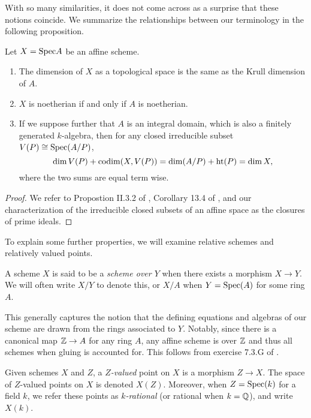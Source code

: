 With so many similarities,
it does not come across as a surprise that these notions coincide.
We summarize the relationships between our terminology in the following proposition.

\begin{proposition}
    Let $X = {\rm Spec} A$ be an affine scheme.
    \begin{enumerate}
        \item The dimension of $X$ as a topological space is the same as the Krull dimension of $A$.
        \item $X$ is noetherian if and only if $A$ is noetherian.
        \item If we suppose further that $A$ is an integral domain, 
        which is also a finitely generated $k$-algebra,
        then for any closed irreducible subset $V(P) \cong {\rm Spec}(A/P)$,
        \[
            \dim V(P) + {\rm codim}(X, V(P)) 
            = \dim(A/P) + {\rm ht}(P) 
            = \dim X,
        \]
        where the two sums are equal term wise.
    \end{enumerate}
\end{proposition}
\begin{proof}
    We refer to Propostion II.3.2 of \cite{Hartshorne_2013},
    Corollary 13.4 of \cite{Eisenbud_2013},
    and our characterization of the irreducible closed subsets of an affine space as the closures of prime ideals.
\end{proof}

To explain some further properties, 
we will examine relative schemes and relatively valued points.

\begin{definition}
    A scheme $X$ is said to be a \textit{scheme over $Y$} when there exists a morphism $X \to Y$.
    We will often write $X/Y$ to denote this,
    or $X/A$ when $Y = {\rm Spec}(A)$ for some ring $A$.
\end{definition}

This generally captures the notion that the defining equations and algebras of our scheme are drawn from the rings associated to $Y$.
Notably, since there is a canonical map $\mathbb{Z} \to A$ for any ring $A$,
any affine scheme is over $\mathbb{Z}$ and thus all schemes when gluing is accounted for.
This follows from exercise 7.3.G of \cite{Vakil_2022}.

\begin{definition}
    Given schemes $X$ and $Z$,
    a \textit{$Z$-valued} point on $X$ is a morphism $Z \to X$.
    The space of $Z$-valued points on $X$ is denoted $X(Z)$.
    Moreover, when $Z = {\rm Spec}(k)$ for a field $k$,
    we refer these points as \textit{$k$-rational}
    (or rational when $k = \mathbb{Q}$),
    and write $X(k)$.
\end{definition}

